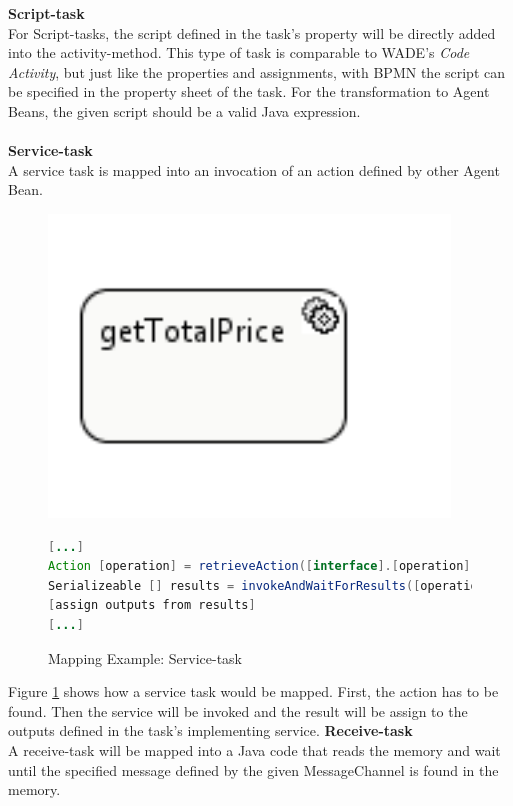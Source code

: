 \textbf{Script-task}\\
For Script-tasks, the script defined in the task's property will be directly added into the activity-method. This type of task is comparable to WADE's \textit{Code Activity}, but just like the properties and assignments, with BPMN the script can be specified in the property sheet of the task. For the transformation to Agent Beans, the given script should be a valid Java expression. \\\\

\textbf{Service-task}\\
A service task is mapped into an invocation of an action defined by other Agent Bean.
\begin{figure}[h]
\begin{minipage}[c]{0.3\textwidth}
\includegraphics[width=0.95\textwidth]{images/mapping/service_task.png}
\end{minipage}
\begin{minipage}[c]{0.7\textwidth}
\begin{lstlisting}[language=Java]
[...]
Action [operation] = retrieveAction([interface].[operation]);
Serializeable [] results = invokeAndWaitForResults([operation], new Serializeable[]{[inputs]}).getResults();
[assign outputs from results]
[...]
\end{lstlisting}
\end{minipage}
\caption{Mapping Example: Service-task}%
\label{fig:service_task}%
\end{figure}
Figure \ref{fig:service_task} shows how a service task would be mapped. First, the action has to be found. Then the service will be invoked and the result will be assign to the outputs defined in the task's implementing service.
\newpage
\textbf{Receive-task}\\
A receive-task will be mapped into a Java code that reads the memory and wait until the specified message defined by the given MessageChannel is found in the memory. \\

